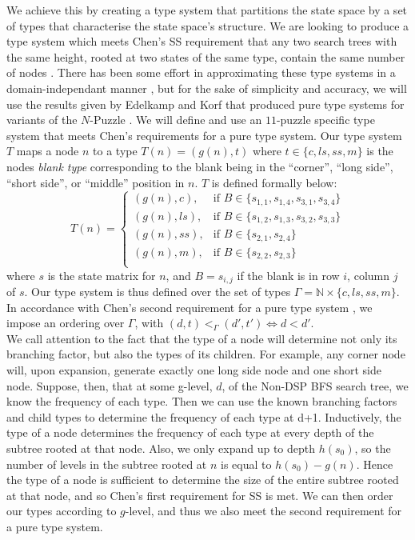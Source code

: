 \documentclass{article}
\begin{document}
We achieve this by creating a type system that 
partitions the state space by a set of
types that characterise the state space's structure.
We are looking to produce a type system which meets Chen's SS
requirement that any two search trees with the same height,
rooted at two states of the same type, contain the same number of nodes \cite{chen1992heuristic}.
There has been some effort in approximating these type systems
in a domain-independant manner \citep{lelis2013active},
but for the sake of simplicity and accuracy, we will use the results given by Edelkamp and Korf that
produced pure type systems for variants of the \(N\)-Puzzle \cite{edelkamp1998branching}. 
We will define and use an \(11\)-puzzle specific type system that meets Chen's requirements for a pure type system.
Our type system \(T\)
maps a node \(n\) to a type \(T(n) = (g(n), t)\) where \(t \in \{c,ls,ss,m\}\) is the nodes \textit{blank type}
corresponding to the blank being in the
``corner'', ``long side'', ``short side'', or ``middle'' position in \(n\).
\(T\) is defined formally below:
$$
T(n) = \begin{cases}
  {(g(n), c)}, & \text{if } B \in \{s_{1,1}, s_{1,4}, s_{3,1}, s_{3,4}\} \\
  {(g(n), ls)}, & \text{if } B \in \{s_{1,2}, s_{1,3}, s_{3,2}, s_{3,3}\} \\
  {(g(n), ss)}, & \text{if } B \in \{s_{2,1}, s_{2,4}\} \\
  {(g(n), m)}, & \text{if } B \in \{s_{2,2}, s_{2,3}\} \\
\end{cases}
$$
where \(s\) is the state matrix for \(n\),
and \(B = s_{i,j}\) if the blank is in row \(i\), column \(j\) of \(s\).
Our type system is thus defined over the set of types \(\Gamma = \mathbb{N} \times \{c,ls,ss,m\}\).
In accordance with Chen's second requirement for a pure type system \cite{chen1992heuristic},
we impose an ordering over \(\Gamma\), with \((d, t) <_{\Gamma} (d', t') \iff d < d'\). \\

We call attention to the fact that the type of a node will determine not only its
branching factor, but also the types of its children.
For example, any corner node will, upon expansion,
generate exactly one long side node and one short side node.
Suppose, then, that at some g-level, \(d\), of the Non-DSP BFS search tree,
we know the frequency of each type.
Then we can use the known branching factors and child types to determine the frequency of each type at d+1.
Inductively, the type of a node determines the frequency of each type at every depth
of the subtree rooted at that node.
Also, we only expand up to depth \(h(s_0)\),
so the number of levels in the subtree rooted at \(n\) is equal to \(h(s_0) - g(n)\).
Hence the type of a node is sufficient to determine the size of the entire subtree rooted at that node,
and so Chen's first requirement for SS is met.
We can then order our types according to \(g\)-level, and thus we also meet the second requirement for a pure type system. \\
\end{document}
